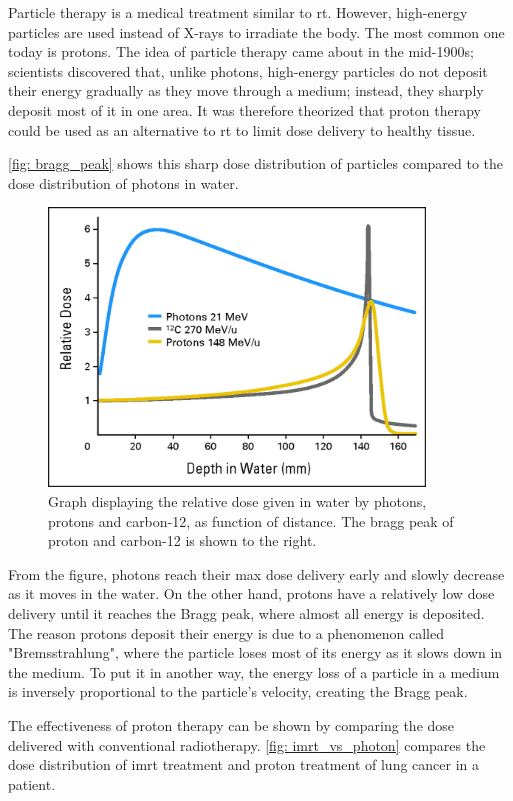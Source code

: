 \documentclass[main.tex]{subfiles}
\begin{document}
Particle therapy is a medical treatment similar to \gls{rt}. However, high-energy particles are used instead of X-rays to irradiate the body. The most common one today is protons. The idea of particle therapy came about in the mid-1900s; scientists discovered that, unlike photons, high-energy particles do not deposit their energy gradually as they move through a medium; instead, they sharply deposit most of it in one area. It was therefore theorized that proton therapy could be used as an alternative to \gls{rt} to limit dose delivery to healthy tissue. 

\autoref{fig: bragg_peak} shows this sharp dose distribution of particles compared to the dose distribution of photons in water.

 \begin{figure}[!htpb]
    \centering
    \includegraphics[width=10cm ]{images/bragg_peak.jpeg}
    \caption{Graph displaying the relative dose given in water by photons, protons and carbon-12, as function of distance. The bragg peak of proton and carbon-12 is shown to the right.\cite{bragg_peak_image}}
    \label{fig: bragg_peak}
\end{figure}
\FloatBarrier 

From the figure, photons reach their max dose delivery early and slowly decrease as it moves in the water. On the other hand, protons have a relatively low dose delivery until it reaches the Bragg peak, where almost all energy is deposited. The reason protons deposit their energy is due to a phenomenon called "Bremsstrahlung", where the particle loses most of its energy as it slows down in the medium. To put it in another way, the energy loss of a particle in a medium is inversely proportional to the particle's velocity, creating the Bragg peak.

The effectiveness of proton therapy can be shown by comparing the dose delivered with conventional radiotherapy. \autoref{fig: imrt_vs_photon} compares the dose distribution of \gls{imrt} treatment and proton treatment of lung cancer in a patient.
\end{document}
